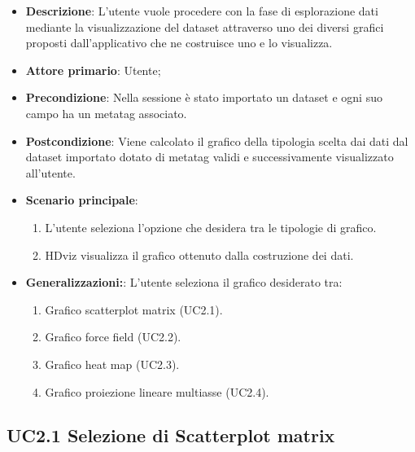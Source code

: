 \begin{itemize}
    \item \textbf{Descrizione}: L’utente vuole procedere con la fase di esplorazione
                                dati mediante la visualizzazione del dataset
                                attraverso uno dei diversi grafici proposti dall’applicativo
                                che ne costruisce uno e lo visualizza.
	
    \item \textbf{Attore primario}: Utente;
    
    \item \textbf{Precondizione}:   Nella sessione è stato importato un dataset e ogni 
                                    suo campo ha un metatag associato.

    \item \textbf{Postcondizione}:  Viene calcolato il grafico della tipologia scelta dai dati 
									dal dataset importato dotato di metatag validi e successivamente 
									visualizzato all'utente.

	\item \textbf{Scenario principale}:
		\begin{enumerate}
			\item L'utente seleziona l'opzione che desidera tra le tipologie di grafico.
			\item HDviz visualizza il grafico ottenuto dalla costruzione dei dati.
        \end{enumerate}

    \item \textbf{Generalizzazioni:}:  L'utente seleziona il grafico desiderato tra:

    \begin{enumerate}
        
        \item Grafico scatterplot matrix (UC2.1).
        \item Grafico force field (UC2.2).
        \item Grafico heat map (UC2.3).
        \item Grafico proiezione lineare multiasse (UC2.4).
        
	\end{enumerate}

\end{itemize}

\subsection{UC2.1 Selezione di Scatterplot matrix}

